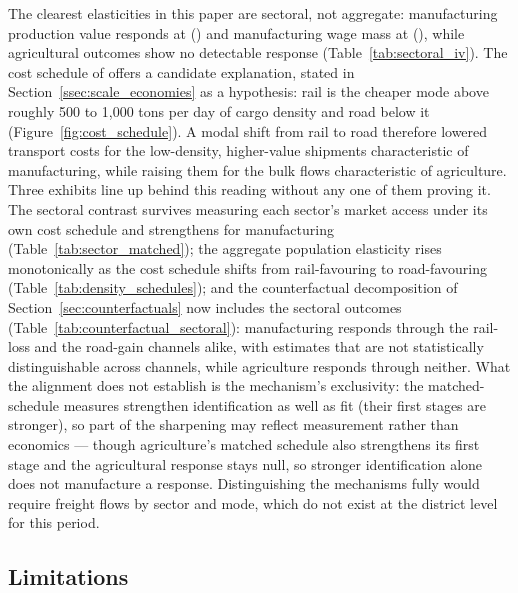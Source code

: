 The clearest elasticities in this paper are sectoral, not aggregate:
manufacturing production value responds at \mfgValprodCoefIVBoth{}
(\mfgValprodSEIVBoth{}) and manufacturing wage mass at
\mfgWageMassCoefIVBoth{} (\mfgWageMassSEIVBoth{}), while agricultural
outcomes
show no detectable response (Table~\ref{tab:sectoral_iv}). The cost
schedule of \citet{baumgartnerpalazzo1969} offers a candidate
explanation, stated in Section~\ref{ssec:scale_economies} as a
hypothesis: rail is the
cheaper mode above roughly 500 to 1{,}000 tons per day of cargo
density and road below it (Figure~\ref{fig:cost_schedule}). A
modal shift from rail to road therefore lowered transport costs for
the low-density, higher-value shipments characteristic of
manufacturing, while raising them for the bulk flows characteristic
of agriculture. Three exhibits line up behind this reading without
any one of them proving it. The sectoral contrast survives measuring
each sector's market access under its own cost schedule and
strengthens for manufacturing (Table~\ref{tab:sector_matched}); the
aggregate population elasticity rises monotonically as the cost
schedule shifts from rail-favouring to road-favouring
(Table~\ref{tab:density_schedules}); and the counterfactual
decomposition of Section~\ref{sec:counterfactuals} now includes the
sectoral outcomes (Table~\ref{tab:counterfactual_sectoral}):
manufacturing responds through the rail-loss and the road-gain
channels alike, with estimates that are not statistically
distinguishable across channels, while agriculture responds through
neither. What the alignment does not establish is the
mechanism's exclusivity: the matched-schedule measures strengthen
identification as well as fit (their first stages are stronger), so
part of the sharpening may reflect measurement rather than
economics --- though agriculture's matched schedule also strengthens
its first stage and the agricultural response stays null, so stronger
identification alone does not manufacture a response. Distinguishing
the mechanisms fully would require freight flows by
sector and mode, which do not exist at the district level for this
period.

\subsection{Limitations}
\label{sec:limitations}

